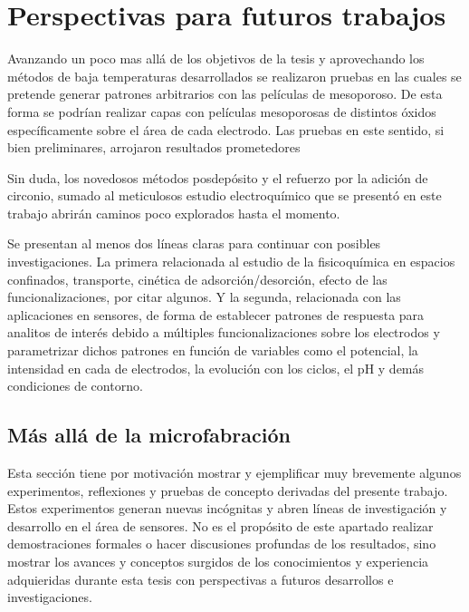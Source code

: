 

\section{Perspectivas para futuros trabajos}


Avanzando un poco mas allá de los objetivos de la tesis y aprovechando los métodos de baja temperaturas desarrollados se realizaron pruebas en las cuales se pretende generar patrones arbitrarios con las películas de mesoporoso. De esta forma se podrían realizar capas con películas mesoporosas de distintos óxidos específicamente sobre el área de cada electrodo. Las pruebas en este sentido, si bien preliminares, arrojaron resultados prometedores

Sin duda, los novedosos métodos posdepósito y el refuerzo por la adición de circonio, sumado al meticulosos estudio electroquímico que se presentó en este trabajo abrirán caminos poco explorados hasta el momento.

Se presentan al menos dos líneas claras para continuar con posibles investigaciones. La primera relacionada al estudio de la fisicoquímica en espacios confinados, transporte, cinética de adsorción/desorción, efecto de las funcionalizaciones, por citar algunos. Y la segunda, relacionada con las aplicaciones en sensores, de forma de establecer patrones de respuesta para analitos de interés debido a múltiples funcionalizaciones sobre los electrodos y parametrizar dichos patrones en función de variables como el potencial, la intensidad en cada de electrodos, la evolución con los ciclos, el pH y demás condiciones de contorno.

\subsection{Más allá de la microfabración}
	
	  Esta sección tiene por motivación mostrar y ejemplificar muy brevemente algunos experimentos, reflexiones y pruebas de concepto derivadas del presente trabajo. Estos experimentos generan nuevas incógnitas y abren líneas de investigación y desarrollo en el área de sensores. No es el propósito de este apartado realizar demostraciones formales o hacer discusiones profundas de los resultados, sino mostrar los avances y conceptos surgidos de los conocimientos y experiencia adquieridas durante esta tesis con perspectivas a futuros desarrollos e investigaciones.

